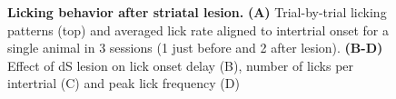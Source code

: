 \begin{figure}[tbh!]
  \begin{center}
    \caption[Licking Behavior After Striatal Lesion]
    {\textbf{Licking behavior after striatal lesion.}
	\textbf{(A)} Trial-by-trial licking patterns (top) and averaged lick rate aligned to intertrial onset for a single animal in 3 sessions (1 just before and 2 after lesion). 
	\textbf{(B-D)} Effect of dS lesion on lick onset delay (B), number of licks per intertrial (C) and peak lick frequency (D)
	}
	\label{fig:lesion:lick}
  \end{center}
\end{figure}